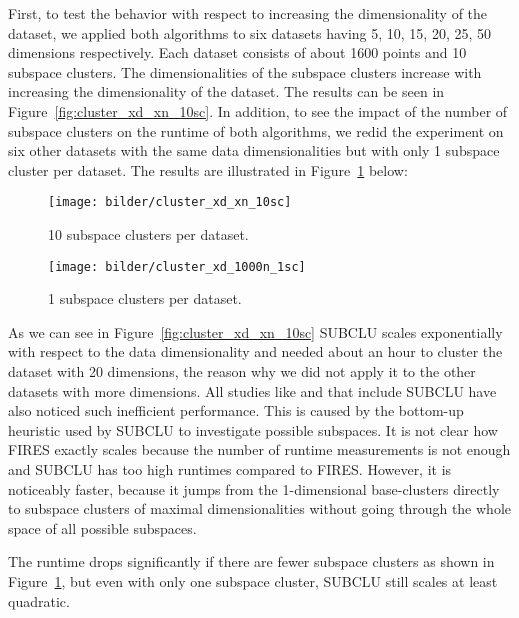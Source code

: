 First, to test the behavior with respect to increasing the dimensionality of the dataset, we applied both algorithms to six datasets having 5, 10, 15, 20, 25, 50 dimensions respectively. Each dataset consists of about 1600 points and 10 subspace clusters. The dimensionalities of the subspace clusters increase with increasing the dimensionality of the dataset. The results can be seen in Figure~\ref{fig:cluster_xd_xn_10sc}. In addition, to see the impact of the number of subspace clusters on the runtime of both algorithms, we redid the experiment on six other datasets with the same data dimensionalities but with only 1 subspace cluster per dataset. The results are illustrated in Figure~\ref{fig:cluster_xd_1000n_1sc} below:
\begin{figure}[H]
	\centering
	\begin{minipage}{0.5\textwidth}
		\centering
		\texttt{[image: bilder/cluster\_xd\_xn\_10sc]}
		\caption{10 subspace clusters per dataset.}
		\label{fig:cluster_xd_xn_10sc}
	\end{minipage}\hfill
	\begin{minipage}{0.5\textwidth}
		\centering
		\texttt{[image: bilder/cluster\_xd\_1000n\_1sc]}
		\caption{1 subspace clusters per dataset.}
		\label{fig:cluster_xd_1000n_1sc}
	\end{minipage}
\end{figure}
As we can see in Figure~\ref{fig:cluster_xd_xn_10sc} SUBCLU scales exponentially with respect to the data dimensionality and needed about an hour to cluster the dataset with 20 dimensions, the reason why we did not apply it to the other datasets with more dimensions. All studies like \citep{10.14778/1687627.1687770} and \citep{10.1145/2063576.2063774} that include SUBCLU have also noticed such inefficient performance. This is caused by the bottom-up heuristic used by SUBCLU to investigate possible subspaces. It is not clear how FIRES exactly scales because the number of runtime measurements is not enough and SUBCLU has too high runtimes compared to FIRES. However, it is noticeably faster, because it jumps from the 1-dimensional base-clusters directly to subspace clusters of maximal dimensionalities without going through the whole space of all possible subspaces.

The runtime drops significantly if there are fewer subspace clusters as shown in Figure~\ref{fig:cluster_xd_1000n_1sc}, but even with only one subspace cluster, SUBCLU still scales at least quadratic. 

